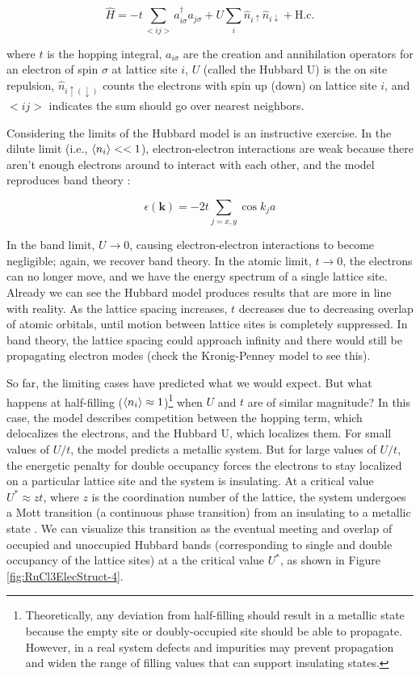 \begin{equation}
\hat{H} = -t \sum_{<ij>} a^{\dagger}_{i \sigma} a_{j \sigma} + U \sum_{i} \hat{n}_{i \uparrow} \hat{n}_{i \downarrow} + \text{H.c.}
\end{equation}

where $t$ is the hopping integral, $a_{i \sigma}$ are the creation and annihilation operators for an electron of spin $\sigma$ at lattice site $i$, $U$ (called the Hubbard U) is the on site repulsion, $\hat{n}_{i\uparrow(\downarrow)}$ counts the electrons with spin up (down) on lattice site $i$, and $<ij>$ indicates the sum should go over nearest neighbors.

Considering the limits of the Hubbard model is an instructive exercise. In the dilute limit (i.e., $\braket{n_{i}} << 1$), electron-electron interactions are weak because there aren't enough electrons around to interact with each other, and the model reproduces band theory \cite{Fazekas1990}:

\begin{equation}
\epsilon(\mathbf{k}) = -2t \sum_{j = x,y} \cos{k_{j} a}
\end{equation}

In the band limit, $U \rightarrow 0$, causing electron-electron interactions to become negligible; again, we recover band theory. In the atomic limit, $t \rightarrow 0$, the electrons can no longer move, and we have the energy spectrum of a single lattice site. Already we can see the Hubbard model produces results that are more in line with reality. As the lattice spacing increases, $t$ decreases due to decreasing overlap of atomic orbitals, until motion between lattice sites is completely suppressed. In band theory, the lattice spacing could approach infinity and there would still be propagating electron modes (check the Kronig-Penney model to see this).

So far, the limiting cases have predicted what we would expect. But what happens at half-filling ($\braket{n_{i}} \approx 1$)\footnote{Theoretically, any deviation from half-filling should result in a metallic state because the empty site or doubly-occupied site should be able to propagate. However, in a real system defects and impurities may prevent propagation and widen the range of filling values that can support insulating states.} when $U$ and $t$ are of similar magnitude? In this case, the model describes competition between the hopping term, which delocalizes the electrons, and the Hubbard U, which localizes them. For small values of $U/t$, the model predicts a metallic system. But for large values of $U/t$, the energetic penalty for double occupancy forces the electrons to stay localized on a particular lattice site and the system is insulating. At a critical value $U^{*} \approx z t$, where $z$ is the coordination number of the lattice, the system undergoes a Mott transition (a continuous phase transition) from an insulating to a metallic state \cite{Fazekas}. We can visualize this transition as the eventual meeting and overlap of occupied and unoccupied Hubbard bands (corresponding to single and double occupancy of the lattice sites) at a the critical value $U^{*}$, as shown in Figure \ref{fig:RuCl3ElecStruct-4}.

